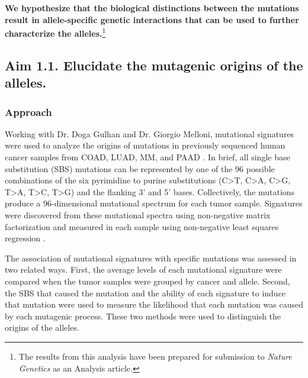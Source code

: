 \textbf{We hypothesize that the biological distinctions between the \KRAS{} mutations result in allele-specific genetic interactions that can be used to further characterize the \KRAS{} alleles.}\footnote{The results from this analysis have been prepared for submission to \emph{Nature Genetics} as an Analysis article.}




\subsection*{Aim 1.1. Elucidate the mutagenic origins of the \KRAS{} alleles.}


\subsubsection*{Approach}

Working with Dr. Doga Gulhan and Dr. Giorgio Melloni, mutational signatures \cite{Alexandrov2013DecipheringCancer., Alexandrov2013, Alexandrov2020TheCancer.} were used to analyze the origins of \KRAS{} mutations in previously sequenced human cancer samples from COAD, LUAD, MM, and PAAD \cite{CancerGenomeAtlasNetwork2012, CancerGenomeAtlasResearchNetwork2014, CancerGenomeAtlasResearchNetwork.Electronicaddress:andrew_aguirredfci.harvard.edu2017, Scarlett2011, Walker2019AAnalysis.}.
In brief, all single base substitution (SBS) mutations can be represented by one of the 96 possible combinations of the six pyrimidine to purine substitutions (C>T, C>A, C>G, T>A, T>C, T>G) and the flanking 3’ and 5’ bases.
Collectively, the mutations produce a 96-dimensional mutational spectrum for each tumor sample.
Signatures were discovered from these mutational spectra using non-negative matrix factorization and measured in each sample using non-negative least squares regression \cite{Alexandrov2013DecipheringCancer., Alexandrov2013}.

The association of mutational signatures with specific \KRAS{} mutations was assessed in two related ways.
First, the average levels of each mutational signature were compared when the tumor samples were grouped by cancer and \KRAS{} allele.
Second, the SBS that caused the \KRAS{} mutation and the ability of each signature to induce that mutation were used to measure the likelihood that each \KRAS{} mutation was caused by each mutagenic process.
These two methods were used to distinguish the origins of the \KRAS{} alleles.

